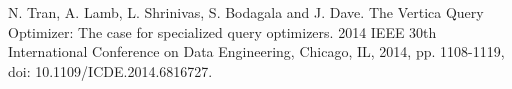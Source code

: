 \documentclass{beamer}
\begin{document}
\begin{frame}[allowframebreaks]
{\begin{thebibliography}{99}
  N. Tran, A. Lamb, L. Shrinivas, S. Bodagala and J. Dave. The Vertica Query Optimizer: The case for specialized query optimizers. 2014 IEEE 30th International Conference on Data Engineering, Chicago, IL, 2014, pp. 1108-1119, doi: 10.1109/ICDE.2014.6816727.






\end{thebibliography}
}
\end{frame}
\end{document}

